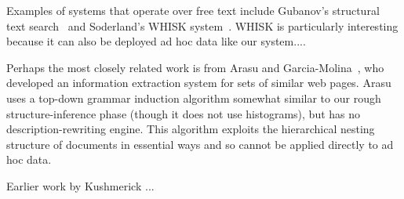 
Examples of systems that operate over free text include
Gubanov's structural text search~\cite{gubanov+:structural-text-search} and 
Soderland's WHISK system~\cite{soderland:whisk}.  WHISK is particularly
interesting because it can also be deployed ad hoc data like our system....



Perhaps the most closely related work is from Arasu and 
Garcia-Molina~\cite{arasu+:sigmod03}, who developed an information
extraction system for sets of similar web pages.  
Arasu uses a top-down grammar induction
algorithm somewhat similar to our rough structure-inference phase
(though it does not use histograms),
but has no description-rewriting engine.  
This algorithm exploits the hierarchical nesting
structure of \xml{} documents in essential ways
and so cannot be applied directly to ad hoc data.  


Earlier work by Kushmerick ...




